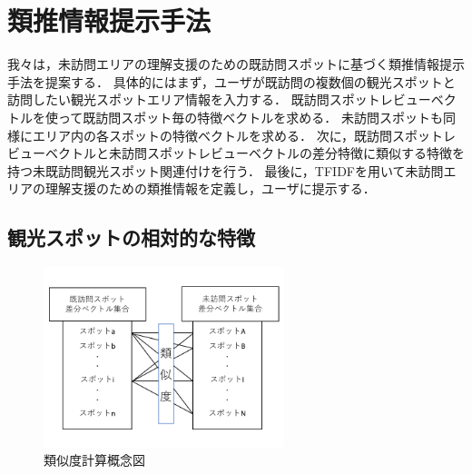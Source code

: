 \documentclass{deimj}
\begin{document}
\section{類推情報提示手法}
\label{sec:Analogical Information Presentation Method}
我々は，未訪問エリアの理解支援のための既訪問スポットに基づく類推情報提示手法を提案する．
具体的にはまず，ユーザが既訪問の複数個の観光スポットと訪問したい観光スポットエリア情報を入力する．
既訪問スポットレビューベクトルを使って既訪問スポット毎の特徴ベクトルを求める．
未訪問スポットも同様にエリア内の各スポットの特徴ベクトルを求める．
次に，既訪問スポットレビューベクトルと未訪問スポットレビューベクトルの差分特徴に類似する特徴を持つ未既訪問観光スポット関連付けを行う．
最後に，TFIDFを用いて未訪問エリアの理解支援のための類推情報を定義し，ユーザに提示する．

\subsection{観光スポットの相対的な特徴}
\label{subsec:Relative features of tourist spots}

\begin{figure}[t]
  \begin{center}
    \includegraphics[clip,width=7.0cm]{picture/Photo_CosSim.png}
    \caption{類似度計算概念図}
    \label{fig:photo_cossim}
    \end{center}
\end{figure}
\end{document}

